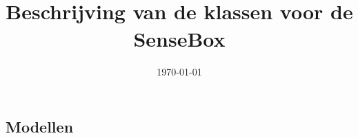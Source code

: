 \documentclass{article}
\title{\LARGE{\titletext}\\\normalsize{Beschrijving van de klassen voor de SenseBox}}
\author{\authortext}
\date{\today}
\newcommand{\contents} {
  {
    \hypersetup{hidelinks}
    \tableofcontents
  }
  \clearpage
}
\begin{document}
    \maketitle
    \vfill
    \newpage

    \contents

    

    \begin{flushleft}
    

    \newpage
    \section{Modellen}

    
    
    
    \end{flushleft}
    
    \newpage
\end{document}
